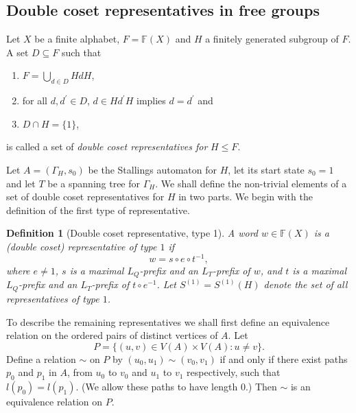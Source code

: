 \documentclass[a4paper,12pt]{article}
\newcommand{\G}{\Gamma }
\newtheorem{definition}[theorem]{Definition}
\numberwithin{equation}{section}
\numberwithin{figure}{section}
\newcommand{\FF}{\ensuremath{\mathbb{F}}}
\newcommand{\be}{\begin{enumerate}}
\newcommand{\ee}{\end{enumerate}}
\begin{document}
\subsection{Double coset representatives in free groups}\label{sub:2cosetrepr}
Let $X$ be a finite alphabet, $F=\FF(X)$ and $H$ a finitely generated subgroup
of $F$.
A  set $D\subseteq F$ such that
\be
\item
$F = \displaystyle{\bigcup_{d \in D} HdH}$, 
\item
for all $d, d^\prime \in D$, $d\in H d^\prime H$
implies $d=d^\prime$ and 
\item $D\cap H=\{1\}$, 
\ee
is called a set of \emph{double coset representatives for} $H\le F$.


Let $A=(\G_H,s_0)$ be the Stallings automaton for $H$, let its start state 
$s_0=1$  and let  $T$ be
a spanning tree for $\G_H$.
We shall define the non-trivial elements of  a set of double coset representatives for $H$ in two parts.
We begin with the definition of the first  type of representative.
\begin{definition}[Double coset representative, type 1] \label{def:repres_t1}
A word $w\in \FF(X)$ is a {\em (double coset) representative of
type} $1$ if
\[w=s\circ e \circ t^{-1},\]
where $e\neq 1$, $s$ is a maximal $L_Q$-prefix and an $L_T$-prefix of $w$,
and $t$ is a maximal $L_Q$-prefix and an
$L_T$-prefix of $t\circ e^{-1}$. Let $S^{(1)}=S^{(1)}(H)$ denote the set of all representatives of type $1$.
\end{definition}


To describe the remaining representatives we shall first define an equivalence
relation on the ordered pairs of distinct vertices of $A$. Let
\[P=\{(u,v)\in V(A)\times V(A): u\neq v\}.\]
Define a relation $\sim$ on $P$ by $(u_0,u_1)\sim (v_0,v_1)$ if and only if
there exist paths $p_0$ and $p_1$ in $A$, from $u_0$ to $v_0$ and $u_1$ to $v_1$
respectively, such that $l(p_0)=l(p_1)$. (We allow these paths to have length $0$.)
Then $\sim$ is an equivalence relation on $P$.
\end{document}
